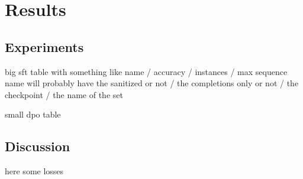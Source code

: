 \documentclass[a4paper,10pt]{article}
\title{}
\author{Jose Rodriguez}
\begin{document}
\maketitle

\begin{abstract}

\end{abstract}

\section{Results}
\subsection{Experiments}
big sft table with something like name / accuracy / instances / max sequence
name will probably have the sanitized or not / the completions only or not / the checkpoint / the name of the set

small dpo table
\subsection{Discussion}
here some losses
\end{document}
